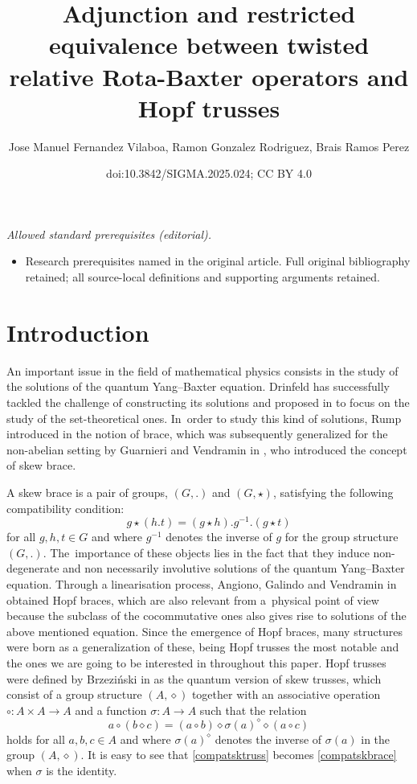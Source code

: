 \documentclass[10pt,a4paper]{amsart}
\title{Adjunction and restricted equivalence between twisted relative Rota-Baxter operators and Hopf trusses}
\author{Jose Manuel Fernandez Vilaboa, Ramon Gonzalez Rodriguez, Brais Ramos Perez}
\date{doi:10.3842/SIGMA.2025.024; CC BY 4.0}
\numberwithin{equation}{section}
\begin{document}
\maketitle
\noindent\textit{Allowed standard prerequisites (editorial).}\begin{itemize}
\item Research prerequisites named in the original article. Full original bibliography retained; all source-local definitions and supporting arguments retained.
\end{itemize}\medskip
\section{Introduction}

An important issue in the field of mathematical physics consists in the study of the solutions of the quantum Yang--Baxter equation. Drinfeld has successfully tackled the challenge of constructing its solutions and proposed in \cite{DR1} to focus on the study of the set-theoretical ones. In~order to study this kind of solutions, Rump introduced in \cite{Rump} the notion of brace, which was subsequently generalized for the non-abelian setting by Guarnieri and Vendramin in \cite{GV}, who introduced the concept of skew brace.

A skew brace is a pair of groups, $(G,.)$ and $(G,\star)$, satisfying the following compatibility condition:
\begin{equation}\label{compatskbrace}
g\star(h. t)=(g\star h). g^{-1}. (g\star t)
\end{equation}
for all $g,h,t\in G$ and where $g^{-1}$ denotes the inverse of $g$ for the group structure $(G,.)$. The~importance of these objects lies in the fact that they induce non-degenerate and non necessarily involutive solutions of the quantum Yang--Baxter equation. Through a linearisation process, Angiono, Galindo and Vendramin in \cite{AGV} obtained Hopf braces, which are also relevant from a~physical point of view because the subclass of the cocommutative ones also gives rise to solutions of the above mentioned equation. Since the emergence of Hopf braces, many structures were born as a generalization of these, being Hopf trusses the most notable and the ones we are going to be interested in throughout this paper. Hopf trusses were defined by Brzezi\'nski in \cite{BRZ1} as the quantum version of skew trusses, which consist of a group structure $(A,\diamond)$ together with an associative operation $\circ\colon A\times A\rightarrow A$ and a function $\sigma\colon A\rightarrow A$ such that the relation
\begin{equation}\label{compatsktruss}
a\circ(b\diamond c)=(a\circ b)\diamond \sigma(a)^{\diamond}\diamond(a \circ c)
\end{equation}
holds for all $a,b,c\in A$ and where $\sigma(a)^{\diamond}$ denotes the inverse of $\sigma(a)$ in the group $(A,\diamond)$. It is easy to see that \eqref{compatsktruss} becomes \eqref{compatskbrace} when $\sigma$ is the identity.
\end{document}
